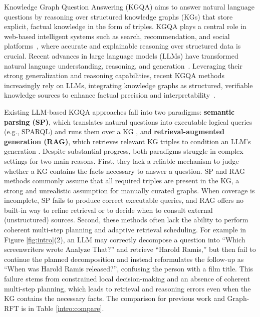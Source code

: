 \documentclass[sigconf]{acmart}
\begin{document}
Knowledge Graph Question Answering (KGQA) aims to answer natural language questions by reasoning over structured knowledge graphs (KGs) that store explicit, factual knowledge in the form of triples. KGQA plays a central role in web-based intelligent systems such as search, recommendation, and social platforms~\cite{khorashadizadeh2024research, zhao2024breaking, zeng2024large, xie2023pixiu, xie2024finben, xie2025medical, wang2023pre}, where accurate and explainable reasoning over structured data is crucial.
Recent advances in large language models (LLMs) have transformed natural language understanding, reasoning, and generation~\cite{hendrycks2020measuring, clark2018think, guo2025deepseek, shi2025search, liu2025visual}. Leveraging their strong generalization and reasoning capabilities, recent KGQA methods increasingly rely on LLMs, integrating knowledge graphs as structured, verifiable knowledge sources to enhance factual precision and interpretability~\cite{sun2023think, jiang2023structgpt, tan2025paths, ma2025debate, liu2025symagent, xue2024decompose}.

Existing LLM-based KGQA approaches fall into two paradigms: \textbf{semantic parsing (SP)}, which translates natural questions into executable logical queries (e.g., SPARQL) and runs them over a KG \cite{li2023few, luo2023chatkbqa, xu2024generate}, and \textbf{retrieval-augmented generation (RAG)}, which retrieves relevant KG triples to condition an LLM’s generation \cite{tan2025paths, xu2024generate}.
Despite substantial progress, both paradigms struggle in complex settings for two main reasons.
First, they lack a reliable mechanism to judge whether a KG contains the facts necessary to answer a question. SP and RAG methods commonly assume that all required triples are present in the KG, a strong and unrealistic assumption for manually curated graphs. When coverage is incomplete, SP fails to produce correct executable queries, and RAG offers no built-in way to refine retrieval or to decide when to consult external (unstructured) sources.
Second, these methods often lack the ability to perform coherent multi-step planning and adaptive retrieval scheduling. For example in Figure \ref{fig:intro}(2), an LLM may correctly decompose a question into ``Which screenwriters wrote Analyze That?'' and retrieve ``Harold Ramis,'' but then fail to continue the planned decomposition and instead reformulates the follow-up as ``When was Harold Ramis released?'', confusing the person with a film title. This failure stems from constrained local decision-making and an absence of coherent multi-step planning, which leads to retrieval and reasoning errors even when the KG contains the necessary facts. 
The comparison for previous work and Graph-RFT is in Table \ref{intro:compare}.
\end{document}
